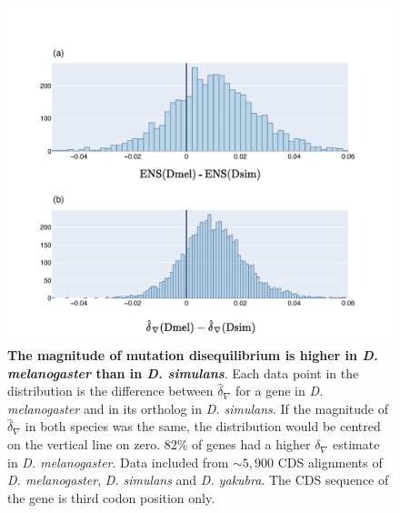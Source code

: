 \begin{figure}[ht!]
\centering
\includegraphics[width=	\textwidth]{figures/plots/drosophila/d-conv-diff.pdf}
\caption{\textbf{The magnitude of mutation disequilibrium is higher in \textit{D. melanogaster} than in \textit{D. simulans}}. Each data point in the distribution is the difference between $\hat\delta_\nabla$ for a gene in \textit{D. melanogaster} and in its ortholog in \textit{D. simulans}. If the magnitude of $\hat\delta_\nabla$ in both species was the same, the distribution would be centred on the vertical line on zero. 82\% of genes had a higher $\delta_\nabla$ estimate in \textit{D. melanogaster}. Data included from $\sim 5,900$ CDS alignments of \textit{D. melanogaster}, \textit{D. simulans} and \textit{D. yakubra}. The CDS sequence of the gene is third codon position only.}
\label{fig:drosophila_d-conv-diff}
\end{figure}
